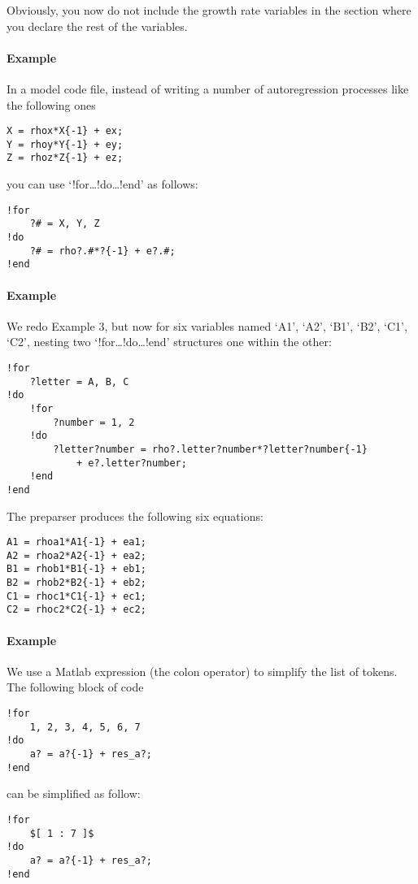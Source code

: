 Obviously, you now do not include the growth rate variables in the
section where you declare the rest of the variables.

\paragraph{Example}\label{example-2}

In a model code file, instead of writing a number of autoregression
processes like the following ones

\begin{verbatim}
X = rhox*X{-1} + ex;
Y = rhoy*Y{-1} + ey;
Z = rhoz*Z{-1} + ez;
\end{verbatim}

you can use `!for\ldots{}!do\ldots{}!end' as follows:

\begin{verbatim}
!for
    ?# = X, Y, Z
!do
    ?# = rho?.#*?{-1} + e?.#;
!end
\end{verbatim}

\paragraph{Example}\label{example-3}

We redo Example 3, but now for six variables named `A1', `A2', `B1',
`B2', `C1', `C2', nesting two `!for\ldots{}!do\ldots{}!end' structures
one within the other:

\begin{verbatim}
!for
    ?letter = A, B, C
!do
    !for
        ?number = 1, 2
    !do
        ?letter?number = rho?.letter?number*?letter?number{-1}
            + e?.letter?number;
    !end
!end
\end{verbatim}

The preparser produces the following six equations:

\begin{verbatim}
A1 = rhoa1*A1{-1} + ea1;
A2 = rhoa2*A2{-1} + ea2;
B1 = rhob1*B1{-1} + eb1;
B2 = rhob2*B2{-1} + eb2;
C1 = rhoc1*C1{-1} + ec1;
C2 = rhoc2*C2{-1} + ec2;
\end{verbatim}

\paragraph{Example}\label{example-4}

We use a Matlab expression (the colon operator) to simplify the list of
tokens. The following block of code

\begin{verbatim}
!for
    1, 2, 3, 4, 5, 6, 7
!do
    a? = a?{-1} + res_a?;
!end
\end{verbatim}

can be simplified as follow:

\begin{verbatim}
!for
    $[ 1 : 7 ]$
!do
    a? = a?{-1} + res_a?;
!end
\end{verbatim}


